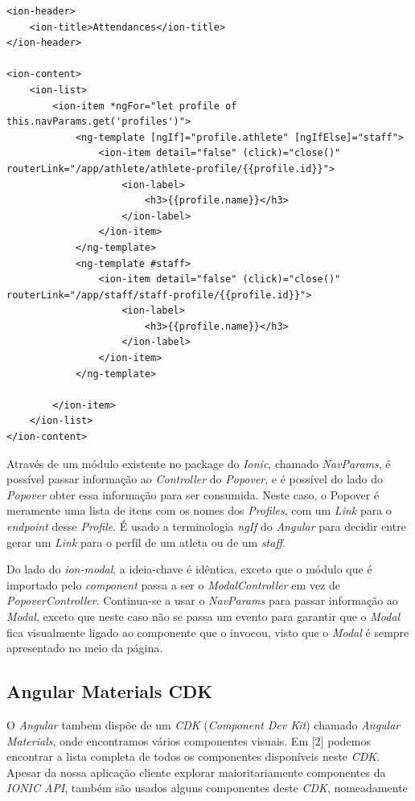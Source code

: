 \begin{lstlisting}
<ion-header>
	<ion-title>Attendances</ion-title>
</ion-header>

<ion-content>
	<ion-list>
		<ion-item *ngFor="let profile of this.navParams.get('profiles')">
			<ng-template [ngIf]="profile.athlete" [ngIfElse]="staff">
				<ion-item detail="false" (click)="close()" routerLink="/app/athlete/athlete-profile/{{profile.id}}">
					<ion-label>
						<h3>{{profile.name}}</h3>
					</ion-label>
				</ion-item>
			</ng-template>
			<ng-template #staff>
				<ion-item detail="false" (click)="close()" routerLink="/app/staff/staff-profile/{{profile.id}}">
					<ion-label>
						<h3>{{profile.name}}</h3>
					</ion-label>
				</ion-item>
			</ng-template>
		
		</ion-item>
	</ion-list>
</ion-content>
\end{lstlisting}

Através de um módulo existente no package do \textit{Ionic}, chamado \textit{NavParams}, é possível passar informação ao \textit{Controller} do \textit{Popover}, e é possível do lado do \textit{Popover} obter essa informação para ser consumida. Neste caso, o Popover é meramente uma lista de itens com os nomes dos \textit{Profiles}, com um \textit{Link} para o \textit{endpoint} desse \textit{Profile}. É usado a terminologia \textit{ngIf} do \textit{Angular} para decidir entre gerar um \textit{Link} para o perfíl de um atleta ou de um \textit{staff}.

Do lado do \textit{ion-modal}, a ideia-chave é idêntica, exceto que o módulo que é importado pelo \textit{component} passa a ser o \textit{ModalController} em vez de \textit{PopoverController}. Continua-se a usar o \textit{NavParams} para passar informação ao \textit{Modal}, exceto que neste caso não se passa um evento para garantir que o \textit{Modal} fica visualmente ligado ao componente que o invocou, visto que o \textit{Modal} é sempre apresentado no meio da página.

\subsection{Angular Materials CDK}

O \textit{Angular} tambem dispõe de um \textit{CDK} (\textit{Component Dev Kit}) chamado \textit{Angular Materials}, onde encontramos vários componentes visuais. Em [2] podemos encontrar a lista completa de todos os componentes disponíveis neste \textit{CDK}. Apesar da nossa aplicação cliente explorar maioritariamente componentes da \textit{IONIC API}, também são usados alguns componentes deste \textit{CDK}, nomeadamente\\

